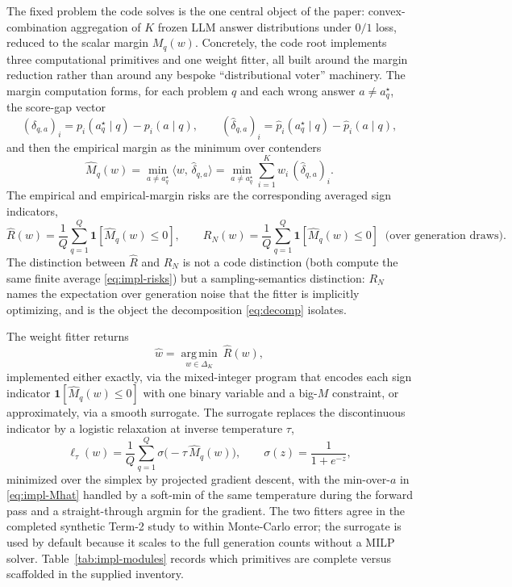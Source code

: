 \documentclass{article} %
\providecommand{\argmin}{\mathop{\mathrm{arg\,min}}\limits}
\providecommand{\simplex}{\Delta_K}
\providecommand{\Risk}{R}
\providecommand{\eRisk}{\widehat{R}}
\providecommand{\ip}[2]{\langle #1,\, #2\rangle}
\providecommand{\dhat}{\widehat{\delta}}
\providecommand{\phat}{\widehat{p}}
\providecommand{\Mhat}{\widehat{M}}
\providecommand{\what}{\widehat{w}}
\begin{document}
The fixed problem the code solves is the one central object of the paper:
convex-combination aggregation of $K$ frozen LLM answer distributions under
$0/1$ loss, reduced to the scalar margin $M_q(w)$.  Concretely, the code root
implements three computational primitives and one weight fitter, all built
around the margin reduction rather than around any bespoke ``distributional
voter'' machinery.  The margin computation forms, for each problem $q$ and each
wrong answer $a\neq a_q^\star$, the score-gap vector
\begin{equation}
\label{eq:impl-delta}
(\delta_{q,a})_i = p_i(a_q^\star\mid q) - p_i(a\mid q),
\qquad
(\dhat_{q,a})_i = \phat_i(a_q^\star\mid q) - \phat_i(a\mid q),
\end{equation}
and then the empirical margin as the minimum over contenders
\begin{equation}
\label{eq:impl-Mhat}
\Mhat_q(w) = \min_{a\neq a_q^\star} \ip{w}{\dhat_{q,a}}
= \min_{a\neq a_q^\star}\sum_{i=1}^K w_i\,(\dhat_{q,a})_i .
\end{equation}
The empirical and empirical-margin risks are the corresponding averaged sign
indicators,
\begin{equation}
\label{eq:impl-risks}
\eRisk(w) = \frac1Q\sum_{q=1}^Q \mathbf 1[\Mhat_q(w)\le 0],
\qquad
\Risk_N(w) = \frac1Q\sum_{q=1}^Q \mathbf 1[\Mhat_q(w)\le 0]
\;\;\text{(over generation draws)}.
\end{equation}
The distinction between $\eRisk$ and $\Risk_N$ is not a code distinction (both
compute the same finite average \eqref{eq:impl-risks}) but a
sampling-semantics distinction: $\Risk_N$ names the expectation over generation
noise that the fitter is implicitly optimizing, and is the object the
decomposition \eqref{eq:decomp} isolates.

The weight fitter returns
\begin{equation}
\label{eq:impl-what}
\what = \argmin_{w\in\simplex}\ \eRisk(w),
\end{equation}
implemented either exactly, via the mixed-integer program that encodes each
sign indicator $\mathbf 1[\Mhat_q(w)\le 0]$ with one binary variable and a
big-$M$ constraint, or approximately, via a smooth surrogate.  The surrogate
replaces the discontinuous indicator by a logistic relaxation at inverse
temperature $\tau$,
\begin{equation}
\label{eq:impl-surrogate}
\ell_\tau(w) = \frac1Q\sum_{q=1}^Q \sigma\!\big(-\tau\,\Mhat_q(w)\big),
\qquad
\sigma(z) = \frac{1}{1+e^{-z}},
\end{equation}
minimized over the simplex by projected gradient descent, with the min-over-$a$
in \eqref{eq:impl-Mhat} handled by a soft-min of the same temperature during the
forward pass and a straight-through argmin for the gradient.  The two fitters
agree in the completed synthetic Term-2 study to within Monte-Carlo error;
the surrogate is used by default because it scales to the full generation
counts without a MILP solver.  Table~\ref{tab:impl-modules} records which
primitives are complete versus scaffolded in the supplied inventory.
\end{document}
